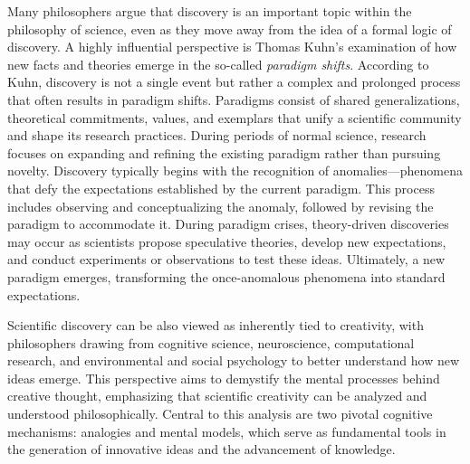 Many philosophers argue that discovery is an important topic within the philosophy of science, even as they move away from the idea of a formal logic of discovery. A highly influential perspective is Thomas Kuhn's examination of how new facts and theories emerge in the so-called \emph{paradigm shifts}. According to Kuhn, discovery is not a single event but rather a complex and prolonged process that often results in paradigm shifts. Paradigms consist of shared generalizations, theoretical commitments, values, and exemplars that unify a scientific community and shape its research practices. During periods of normal science, research focuses on expanding and refining the existing paradigm rather than pursuing novelty. Discovery typically begins with the recognition of anomalies—phenomena that defy the expectations established by the current paradigm. This process includes observing and conceptualizing the anomaly, followed by revising the paradigm to accommodate it. During paradigm crises, theory-driven discoveries may occur as scientists propose speculative theories, develop new expectations, and conduct experiments or observations to test these ideas. Ultimately, a new paradigm emerges, transforming the once-anomalous phenomena into standard expectations.

Scientific discovery can be also viewed as inherently tied to creativity, with philosophers drawing from cognitive science, neuroscience, computational research, and environmental and social psychology to better understand how new ideas emerge. This perspective aims to demystify the mental processes behind creative thought, emphasizing that scientific creativity can be analyzed and understood philosophically. Central to this analysis are two pivotal cognitive mechanisms: analogies and mental models, which serve as fundamental tools in the generation of innovative ideas and the advancement of knowledge.

